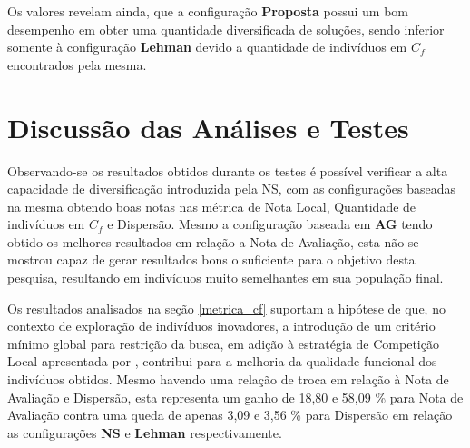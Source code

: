 Os valores revelam ainda, que a configuração \textbf{Proposta} possui um bom desempenho em obter uma quantidade diversificada de soluções, sendo inferior somente à configuração \textbf{Lehman} devido a quantidade de indivíduos em $C_f$ encontrados pela mesma.

\section{Discussão das Análises e Testes}
\label{discussao_analise_e_testes}

Observando-se os resultados obtidos durante os testes é possível verificar a alta capacidade de diversificação introduzida pela NS, com as configurações baseadas na mesma obtendo boas notas nas métrica de Nota Local, Quantidade de indivíduos em $C_f$ e Dispersão. Mesmo a configuração baseada em \textbf{AG} tendo obtido os melhores resultados em relação a Nota de Avaliação, esta não se mostrou capaz de gerar resultados bons o suficiente para o objetivo desta pesquisa, resultando em indivíduos muito semelhantes em sua população final.

Os resultados analisados na seção \ref{metrica_cf} suportam a hipótese de que, no contexto de exploração de indivíduos inovadores, a introdução de um critério mínimo global para restrição da busca, em adição à estratégia de Competição Local apresentada por \cite{lehman2011evolving}, contribui para a melhoria da qualidade funcional dos indivíduos obtidos. Mesmo havendo uma relação de troca em relação à Nota de Avaliação e Dispersão, esta representa um ganho de 18,80 e 58,09 \% para Nota de Avaliação contra uma queda de apenas 3,09 e 3,56 \% para Dispersão em relação as configurações \textbf{NS} e \textbf{Lehman} respectivamente.

